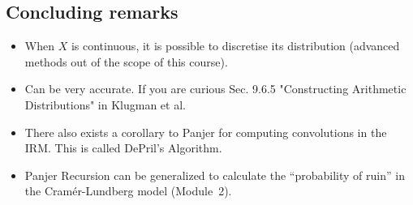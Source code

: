 \documentclass[11pt]{beamer}
\begin{document}
\subsection{Concluding remarks}
\begin{frame}

\begin{itemize}
\item When $X$ is continuous, it is possible to discretise its distribution (advanced methods out of the scope of this course). 
\vfill
\item Can be very accurate. If you are curious Sec. 9.6.5 "Constructing Arithmetic Distributions" in Klugman et al.
\vfill
\item There also exists a corollary to Panjer for computing convolutions in the IRM. This is called DePril's Algorithm. 
\vfill
\item Panjer Recursion can be generalized to calculate the ``probability of ruin'' in the Cram\'er-Lundberg model (Module~2).
\end{itemize}

\end{frame}
\end{document}

